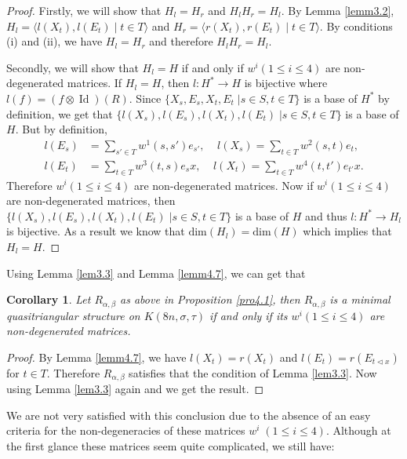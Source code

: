 \documentclass[a4paper,11pt]{amsart}
\def \id{\operatorname{Id}}
\def \id{\operatorname{Id}}
\numberwithin{equation}{section}
\newtheorem{corollary}[theorem]{Corollary}
\begin{document}
\begin{proof}
Firstly, we will show that $H_l=H_r$ and $H_lH_r=H_l$. By Lemma \ref{lemm3.2},  $H_l=\langle l(X_t),l(E_t)\;|\;t\in T\rangle $  and $H_r=\langle r(X_t),r(E_t)\;|\;t\in T\rangle $. By conditions (i) and (ii), we have $H_l=H_r$ and therefore $H_lH_r=H_l$.

Secondly, we will show that $H_l=H$ if and only if $w^i(1\leq i\leq 4)$ are non-degenerated matrices. If $H_l=H$, then $l:H^*\rightarrow H$ is bijective where $l(f)=(f \otimes \id)(R)$. Since $\{X_s,E_s,X_t,E_t\;|s\in S,t\in T\}$ is a base of $H^*$ by definition, we get that $\{l(X_s),l(E_s),l(X_t),l(E_t)\;|s\in S,t\in T\}$ is a base of $H$. But by definition,
\begin{align*}
l(E_s)&=\sum_{s'\in T}w^1(s,s')e_{s'},\;\;\;\;
l(X_s)=\sum_{t\in T}w^2(s,t)e_{t},\\
l(E_t)&=\sum_{t\in T}w^3(t,s)e_{s}x,\;\;\;\;
l(X_t)=\sum_{t\in T}w^4(t,t')e_{t'}x.
\end{align*}
Therefore $w^i(1\leq i\leq 4)$ are non-degenerated matrices. Now if $w^i(1\leq i\leq 4)$ are non-degenerated matrices, then $\{l(X_s),l(E_s),l(X_t),l(E_t)\;|s\in S,t\in T\}$ is a base of $H$ and thus $l:H^*\rightarrow H_l$ is bijective. As a result we know that $\text{dim}(H_l)=\text{dim}(H)$ which implies that $H_l=H$.
\end{proof}

Using Lemma \ref{lem3.3} and Lemma \ref{lemm4.7}, we can get that
\begin{corollary} \label{coro4.1}
Let $R_{\alpha,\beta}$ as above in Proposition \ref{pro4.1}, then $R_{\alpha,\beta}$ is a minimal quasitriangular structure on $K(8n,\sigma,\tau)$ if and only if its $w^i(1\leq i\leq4)$ are non-degenerated matrices.
\end{corollary}

\begin{proof}
 By Lemma \ref{lemm4.7}, we have $l(X_t)=r(X_t)$ and $l(E_t)=r(E_{t\triangleleft x})$ for $t\in T$. Therefore $R_{\alpha,\beta}$ satisfies that the condition of Lemma \ref{lem3.3}. Now using Lemma \ref{lem3.3} again and we get the result.
\end{proof}
We are not very satisfied with this conclusion due to the absence of an easy criteria for the non-degeneracies of these matrices $w^{i}\;(1\leq i\leq 4)$. Although at the first glance these matrices seem quite complicated, we still have:
\end{document}
